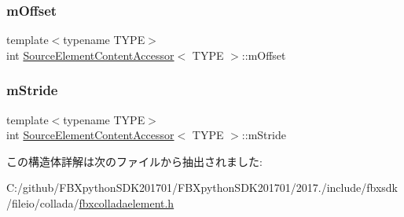 \mbox{\label{struct_source_element_content_accessor_a1450ec3072e82c51aacd05fc21d15546}} 
\subsubsection{\texorpdfstring{m\+Offset}{mOffset}}
{\footnotesize\ttfamily template$<$typename T\+Y\+PE$>$ \\
int \hyperlink{struct_source_element_content_accessor}{Source\+Element\+Content\+Accessor}$<$ T\+Y\+PE $>$\+::m\+Offset}

\mbox{\label{struct_source_element_content_accessor_af3895bda51b49a9086b11eaa7012ee2d}} 
\subsubsection{\texorpdfstring{m\+Stride}{mStride}}
{\footnotesize\ttfamily template$<$typename T\+Y\+PE$>$ \\
int \hyperlink{struct_source_element_content_accessor}{Source\+Element\+Content\+Accessor}$<$ T\+Y\+PE $>$\+::m\+Stride}



この構造体詳解は次のファイルから抽出されました\+:\begin{DoxyCompactItemize}
\item 
C\+:/github/\+F\+B\+Xpython\+S\+D\+K201701/\+F\+B\+Xpython\+S\+D\+K201701/2017./include/fbxsdk/fileio/collada/\hyperlink{fbxcolladaelement_8h}{fbxcolladaelement.\+h}\end{DoxyCompactItemize}
